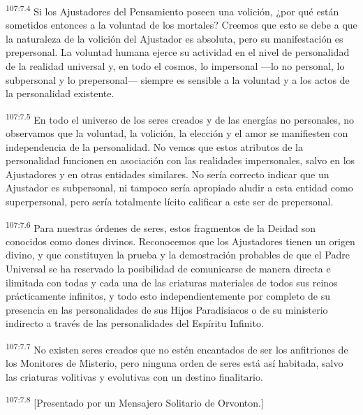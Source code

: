 \par
\textsuperscript{107:7.4} Si los Ajustadores del Pensamiento poseen una volición, ¿por qué están sometidos entonces a la voluntad de los mortales? Creemos que esto se debe a que la naturaleza de la volición del Ajustador es absoluta, pero su manifestación es prepersonal. La voluntad humana ejerce su actividad en el nivel de personalidad de la realidad universal y, en todo el cosmos, lo impersonal ---lo no personal, lo subpersonal y lo prepersonal--- siempre es sensible a la voluntad y a los actos de la personalidad existente.

\par
\textsuperscript{107:7.5} En todo el universo de los seres creados y de las energías no personales, no observamos que la voluntad, la volición, la elección y el amor se manifiesten con independencia de la personalidad. No vemos que estos atributos de la personalidad funcionen en asociación con las realidades impersonales, salvo en los Ajustadores y en otras entidades similares. No sería correcto indicar que un Ajustador es subpersonal, ni tampoco sería apropiado aludir a esta entidad como superpersonal, pero sería totalmente lícito calificar a este ser de prepersonal.

\par
\textsuperscript{107:7.6} Para nuestras órdenes de seres, estos fragmentos de la Deidad son conocidos como dones divinos. Reconocemos que los Ajustadores tienen un origen divino, y que constituyen la prueba y la demostración probables de que el Padre Universal se ha reservado la posibilidad de comunicarse de manera directa e ilimitada con todas y cada una de las criaturas materiales de todos sus reinos prácticamente infinitos, y todo esto independientemente por completo de su presencia en las personalidades de sus Hijos Paradisiacos o de su ministerio indirecto a través de las personalidades del Espíritu Infinito.

\par
\textsuperscript{107:7.7} No existen seres creados que no estén encantados de ser los anfitriones de los Monitores de Misterio, pero ninguna orden de seres está así habitada, salvo las criaturas volitivas y evolutivas con un destino finalitario.

\par
\textsuperscript{107:7.8} [Presentado por un Mensajero Solitario de Orvonton.]